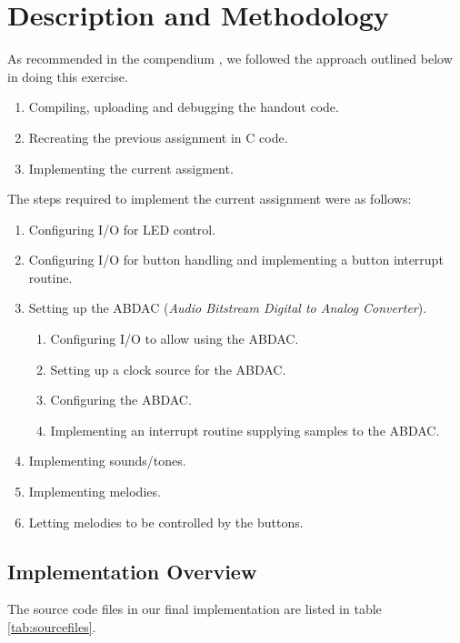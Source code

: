 \section{Description and Methodology}

As recommended in the compendium \cite{comp}, we followed the approach
outlined below in doing this exercise.

\begin{enumerate}
    \item Compiling, uploading and debugging the handout code.
    \item Recreating the previous assignment in C code.
    \item Implementing the current assigment.
\end{enumerate}

The steps required to implement the current assignment were as follows:

\begin{enumerate}
    \item Configuring I/O for LED control.
    \item Configuring I/O for button handling and implementing a button
    interrupt routine.
    \item Setting up the ABDAC (\emph{Audio Bitstream Digital to Analog
    Converter}).
        \begin{enumerate}
            \item Configuring I/O to allow using the ABDAC.
            \item Setting up a clock source for the ABDAC.
            \item Configuring the ABDAC.
            \item Implementing an interrupt routine supplying samples to
            the ABDAC.
        \end{enumerate}
    \item Implementing sounds/tones.
    \item Implementing melodies.
    \item Letting melodies to be controlled by the buttons.
\end{enumerate}

\subsection{Implementation Overview}

The source code files in our final implementation are listed in table
\ref{tab:sourcefiles}.

